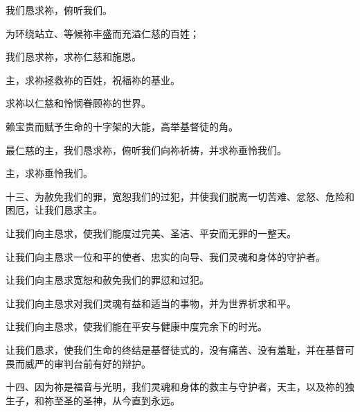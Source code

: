 我们恳求祢，俯听我们。\par

为环绕站立、等候祢丰盛而充溢仁慈的百姓；\par

我们恳求祢，求祢仁慈和施恩。\par

主，求祢拯救祢的百姓，祝福祢的基业。\par

求祢以仁慈和怜悯眷顾祢的世界。\par

赖宝贵而赋予生命的十字架的大能，高举基督徒的角。\par

最仁慈的主，我们恳求祢，俯听我们向祢祈祷，并求祢垂怜我们。\par

\par

主，求祢垂怜我们。\par

\par

十三、为赦免我们的罪，宽恕我们的过犯，并使我们脱离一切苦难、忿怒、危险和困厄，让我们恳求主。\par

让我们向主恳求，使我们能度过完美、圣洁、平安而无罪的一整天。\par

让我们向主恳求一位和平的使者、忠实的向导、我们灵魂和身体的守护者。\par

让我们向主恳求宽恕和赦免我们的罪愆和过犯。\par

让我们向主恳求对我们灵魂有益和适当的事物，并为世界祈求和平。\par

让我们向主恳求，使我们能在平安与健康中度完余下的时光。\par

让我们恳求，使我们生命的终结是基督徒式的，没有痛苦、没有羞耻，并在基督可畏而威严的审判台前有好的辩护。\par

\par

十四、因为祢是福音与光明，我们灵魂和身体的救主与守护者，天主，以及祢的独生子，和祢至圣的圣神，从今直到永远。\par

\par

